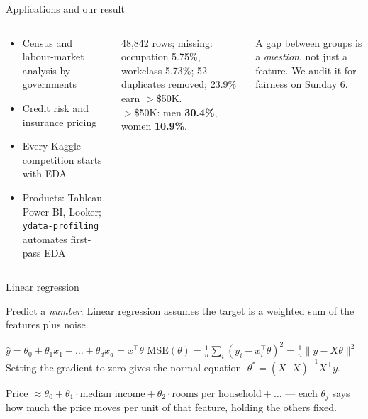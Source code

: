 \documentclass[aspectratio=169,11pt]{beamer}
\begin{document}
\begin{frame}{Applications and our result}
\begin{columns}[T]
\begin{bapp}
\begin{itemize}
\item Census and labour-market analysis by governments
\item Credit risk and insurance pricing
\item Every Kaggle competition starts with EDA
\item Products: Tableau, Power BI, Looker; \texttt{ydata-profiling} automates first-pass EDA
\end{itemize}
\end{bapp}
\begin{bres}
48,842 rows; missing: occupation 5.75\%, workclass 5.73\%; 52 duplicates removed; 23.9\% earn $>$\$50K.\\[2pt]
$>$\$50K: men \textbf{30.4\%}, women \textbf{10.9\%}.
\end{bres}
\begin{bwarn}
A gap between groups is a \emph{question}, not just a feature. We audit it for fairness on Sunday 6.
\end{bwarn}
\end{columns}
\end{frame}


\begin{frame}{Linear regression}
\begin{bdef}[Regression]
Predict a \emph{number}. Linear regression assumes the target is a weighted sum of the features plus noise.
\end{bdef}
\begin{bmath}
$\hat y=\theta_0+\theta_1x_1+\dots+\theta_dx_d=x^\top\theta$ \qquad
$\mathrm{MSE}(\theta)=\frac1n\sum_i(y_i-x_i^\top\theta)^2=\frac1n\lVert y-X\theta\rVert^2$\\[3pt]
Setting the gradient to zero gives the normal equation $\;\theta^\ast=(X^\top X)^{-1}X^\top y$.
\end{bmath}
\begin{bex}[Intuition]
Price $\approx \theta_0 + \theta_1\cdot\text{median income} + \theta_2\cdot\text{rooms per household}+\dots$ --- each $\theta_j$ says how much the price moves per unit of that feature, holding the others fixed.
\end{bex}
\end{frame}
\end{document}
